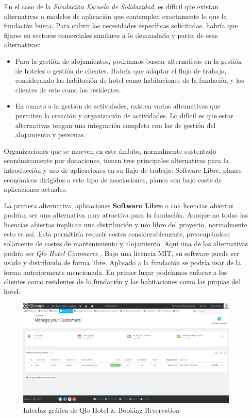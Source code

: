 En el caso de la \textit{Fundación Escuela de Solidaridad}, es difícil que existan alternativas o modelos de aplicación que contemplen exactamente lo que la fundación busca. Para cubrir las necesidades específicas solicitadas, habría que fijarse en sectores comerciales similares a lo demandado y partir de esas alternativas:

\begin{itemize}
    \item Para la gestión de alojamientos, podríamos buscar alternativas en la gestión de hoteles o gestión de clientes. Habría que adaptar el flujo de trabajo, considerando las habitación de hotel como habitaciones de la fundación y los clientes de este como los residentes.
    \item En cuanto a la gestión de actividades, existen varias alternativas que permiten la creación y organización de actividades. Lo difícil es que estas alternativas tengan una integración completa con las de gestión del alojamiento y personas.
\end{itemize}

Organizaciones que se mueven en este ámbito, normalmente sustentado económicamente por donaciones, tienen tres principales alternativas para la introducción y uso de aplicaciones en su flujo de trabajo: Software Libre, planes económicos dirigidos a este tipo de asociaciones, planes con bajo coste de aplicaciones actuales. 

La primera alternativa, aplicaciones \textbf{Software Libre} o con licencias abiertas podrían ser una alternativa muy atractiva para la fundación. Aunque no todas las licencias abiertas implican una distribución y uso libre del proyecto, normalmente esto es así. Esto permitiría reducir costes considerablemente, preocupándose solamente de costes de mantenimiento y alojamiento. Aquí una de las alternativas podría ser \textit{Qlo Hotel Commerce} \cite{qloapps}. Bajo una licencia MIT, su software puede ser usado y distribuido de forma libre. Aplicado a la fundación se podría usar de la forma anteriormente mencionada. En primer lugar podríamos enfocar a los clientes como residentes de la fundación y las habitaciones como las propias del hotel. 

\begin{figure}[htbp]
    \centerline{\includegraphics[width=\textwidth]{imagenes/estado_arte/qlo.png}}
    \caption{Interfaz gráfica de Qlo Hotel \& Booking Reservation}
    \label{fig}
\end{figure}

